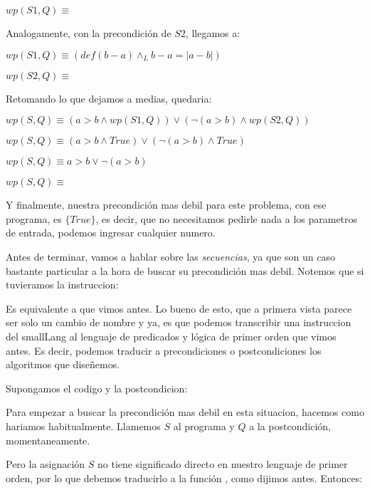 \documentclass{article}
\begin{document}
$wp(S1, Q) \equiv$ \True

Analogamente, con la precondición de $S2$, llegamos a:

$wp(S1, Q) \equiv (def(b - a) \land_{L} b-a = |a-b|)$

$wp(S2, Q) \equiv$ \True

Retomando lo que dejamos a medias, quedaria:

$wp(S, Q) \equiv (a > b \land wp(S1, Q)) \lor (\neg (a > b) \land wp(S2, Q))$

$wp(S, Q) \equiv (a > b \land True) \lor (\neg (a > b) \land True)$

$wp(S, Q) \equiv a > b \lor \neg (a > b)$

$wp(S, Q) \equiv$ \True

Y finalmente, nuestra precondición mas debil para este problema, con ese programa, es $\{ True \}$, es decir, que no necesitamos pedirle nada a los parametros de entrada, podemos ingresar cualquier numero.

Antes de terminar, vamos a hablar sobre las \textit{secuencias}, ya que son un caso bastante particular a la hora de buscar su precondición mas debil. Notemos que si tuvieramos la instruccion:


Es equivalente a  que vimos antes. Lo bueno de esto, que a primera vista parece ser solo un cambio de nombre y ya, es que podemos transcribir una instruccion del smallLang al lenguaje de predicados y lógica de primer orden que vimos antes. Es decir, podemos traducir a precondiciones o postcondiciones los algoritmos que diseñemos.

Supongamos el codigo y la postcondicion:


Para empezar a buscar la precondición mas debil en esta situacion, hacemos como hariamos habitualmente. Llamemos $S$ al programa y $Q$ a la postcondición, momentaneamente.


Pero la asignación $S$ no tiene significado directo en nuestro lenguaje de primer orden, por lo que debemos traducirlo a la función \setAt{}{}{}, como dijimos antes. Entonces:

\end{document}

